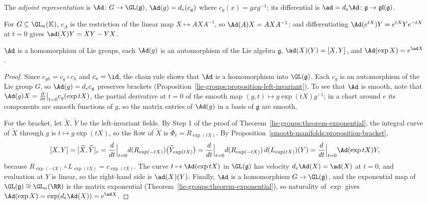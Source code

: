 \begin{definition}\label{lie-groups:definition-adjoint}
The \emph{adjoint representation} is $\Ad \colon G \to \GL(\mathfrak{g})$, $\Ad(g) = d_e(c_g)$ where $c_g(x) = gxg^{-1}$; its differential is $\ad = d_e\Ad \colon \mathfrak{g} \to \mathfrak{gl}(\mathfrak{g})$.
\end{definition}

For $G \subseteq \GL_n(\mathbb{K})$, $c_A$ is the restriction of the linear map $X \mapsto AXA^{-1}$, so $\Ad(A)X = AXA^{-1}$; and differentiating
$\Ad(e^{tX})Y = e^{tX}Ye^{-tX}$ at $t = 0$ gives $\ad(X)Y = XY - YX$.

\begin{proposition}\label{lie-groups:proposition-adjoint}
$\Ad$ is a homomorphism of Lie groups, each $\Ad(g)$ is an automorphism of the Lie algebra $\mathfrak{g}$, $\ad(X)(Y) = [X, Y]$, and $\Ad(\exp X) = e^{\ad X}$.
\end{proposition}

\begin{proof}
Since $c_{gh} = c_g \circ c_h$ and $c_e = \id$, the chain rule shows that $\Ad$ is a homomorphism into $\GL(\mathfrak{g})$. Each $c_g$ is an automorphism of
the Lie group $G$, so $\Ad(g) = d_ec_g$ preserves brackets (Proposition~\ref{lie-groups:proposition-left-invariant}). To see that $\Ad$ is smooth, note that
$\Ad(g)X = \frac{\partial}{\partial t}\big|_{t=0}c_g(\exp tX)$, the partial derivative at $t = 0$ of the smooth map $(g, t) \mapsto g\exp(tX)g^{-1}$; in a chart
around $e$ its components are smooth functions of $g$, so the matrix entries of $\Ad(g)$ in a basis of $\mathfrak{g}$ are smooth.

For the bracket, let $\widetilde{X}$, $\widetilde{Y}$ be the left-invariant fields. By Step 1 of the proof of Theorem~\ref{lie-groups:theorem-exponential}, the
integral curve of $\widetilde{X}$ through $g$ is $t \mapsto g\exp(tX)$, so the flow of $\widetilde{X}$ is $\Phi_t = R_{\exp(tX)}$. By
Proposition~\ref{smooth-manifolds:proposition-bracket},
\[
[X, Y] = [\widetilde{X}, \widetilde{Y}]_e = \frac{d}{dt}\Big|_{t=0}d(R_{\exp(-tX)})\bigl(\widetilde{Y}_{\exp(tX)}\bigr)
= \frac{d}{dt}\Big|_{t=0}d(R_{\exp(-tX)})\,d(L_{\exp(tX)})(Y) = \frac{d}{dt}\Big|_{t=0}\Ad(\exp tX)Y,
\]
because $R_{\exp(-tX)} \circ L_{\exp(tX)} = c_{\exp(tX)}$. The curve $t \mapsto \Ad(\exp tX)$ in $\GL(\mathfrak{g})$ has velocity $d_e\Ad(X) = \ad(X)$ at $t = 0$,
and evaluation at $Y$ is linear, so the right-hand side is $\ad(X)(Y)$. Finally, $\Ad$ is a homomorphism $G \to \GL(\mathfrak{g})$, and the exponential map of
$\GL(\mathfrak{g}) \cong \GL_n(\RR)$ is the matrix exponential (Theorem~\ref{lie-groups:theorem-exponential}), so naturality of $\exp$ gives
$\Ad(\exp X) = \exp(d_e\Ad(X)) = e^{\ad X}$.
\end{proof}

